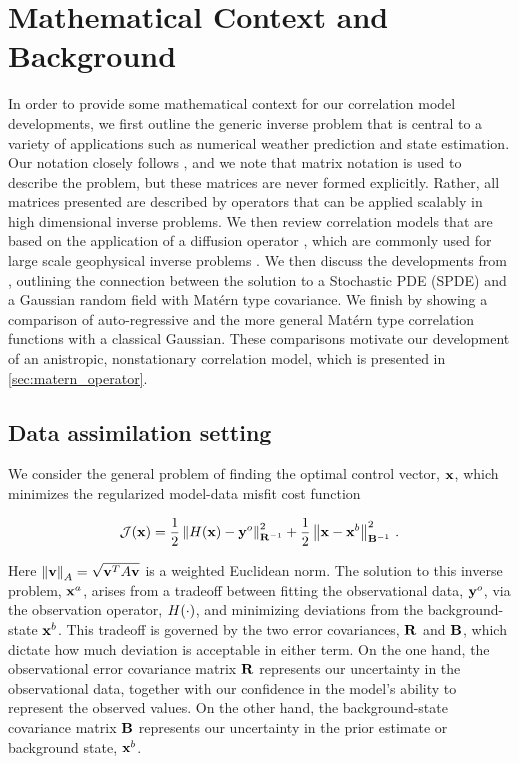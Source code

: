 \section{Mathematical Context and Background}
\label{sec:review}

In order to provide some mathematical context for our correlation model
developments, we first outline the generic inverse problem that is central to
a variety of applications such as numerical weather prediction and state
estimation.
Our notation closely follows \citet{ide_unified_1997}, and we note that matrix
notation is used to describe the problem, but these matrices are never formed
explicitly.
Rather, all matrices presented are described by operators that can be applied
scalably in high dimensional inverse problems.
We then review correlation models that are based on the application of a
diffusion operator \citep{weaver_correlation_2001,mirouze_representation_2010},
which are commonly used for large scale geophysical inverse problems
\citep[e.g.,][]{forgetECCOv4,moore_regional_2011-1}.
We then discuss the developments from \citet{RSSB:RSSB777}, outlining the
connection between the solution to a Stochastic PDE (SPDE) and a Gaussian random
field with Mat\'ern type covariance.
We finish by showing a comparison of auto-regressive and the more general
Mat\'ern type correlation functions with a classical Gaussian.
These comparisons motivate our development of an anistropic, nonstationary correlation
model, which is presented in \cref{sec:matern_operator}.


\subsection{Data assimilation setting}
\label{ssec:da_formulation}

We consider the general problem of finding the optimal control vector,
$\mathbf{x}$, which minimizes the regularized model-data misfit cost function
\begin{linenomath*}\begin{equation*}
    \mathcal{J}(\mathbf{x}) =
        \dfrac{1}{2}\left\lVert H(\mathbf{x}) - \mathbf{y}^{o}\right\rVert_{\mathbf{R}^{-1}}^2
        +
        \dfrac{1}{2}\left\lVert\mathbf{x} - \mathbf{x}^{b}\right\rVert_{\mathbf{B}^{-1}}^2 \, .
\end{equation*}\end{linenomath*}
Here $\left\lVert\mathbf{v}\right\rVert_A = \sqrt{\mathbf{v}^T A \mathbf{v}}$ is a weighted
Euclidean norm.
The solution to this inverse problem, $\mathbf{x}^{a}$, arises from a tradeoff between fitting the
observational data, $\mathbf{y}^{o}$, via the observation operator, $H(\cdot)$,
and minimizing deviations from the background-state $\mathbf{x}^{b}$.
This tradeoff is governed by the two error covariances, $\mathbf{R}$ and
$\mathbf{B}$, which dictate how much deviation is acceptable in either term.
On the one hand, the observational error covariance matrix
$\mathbf{R}$ represents our uncertainty
in the observational data, together with our confidence in the model's ability
to represent the observed values.
On the other hand, the background-state covariance matrix $\mathbf{B}$
represents our uncertainty in the prior estimate or background state,
$\mathbf{x}^{b}$.

